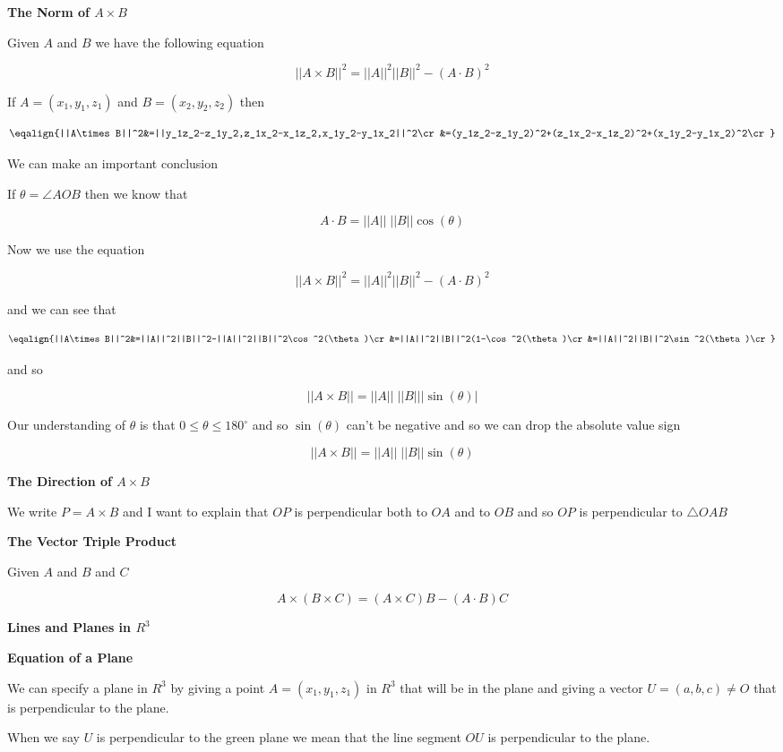 \filbreak
\vskip 1cm
{\bf The Norm of $A\times B$}

\vskip 1mm
Given $A$ and $B$ we have the following equation

$$||A\times B||^2=||A||^2||B||^2-(A\cdot B)^2$$

\vskip 1mm
If $A=(x_1,y_1,z_1)$ and $B=(x_2,y_2,z_2)$ then

$$\eqalign{||A\times B||^2&=||y_1z_2-z_1y_2,z_1x_2-x_1z_2,x_1y_2-y_1x_2||^2\cr
		&=(y_1z_2-z_1y_2)^2+(z_1x_2-x_1z_2)^2+(x_1y_2-y_1x_2)^2\cr}$$

\vskip 1mm
We can make an important conclusion

\vskip 1mm
If $\theta=\angle AOB$ then we know that

$$A\cdot B=||A||\;||B||\cos(\theta)$$

Now we use the equation

$$||A\times B||^2=||A||^2||B||^2-(A\cdot B)^2$$

and we can see that

$$\eqalign{||A\times B||^2&=||A||^2||B||^2-||A||^2||B||^2\cos^2(\theta)\cr
		&=||A||^2||B||^2(1-\cos^2(\theta)\cr
		&=||A||^2||B||^2\sin^2(\theta)\cr}$$

and so

$$||A\times B||=||A||\;||B|||\sin(\theta)|$$

Our understanding of $\theta$ is that $0\leq\theta\leq180^\circ$ and so $\sin(\theta)$ can't be negative and so we can drop the absolute value sign

$$||A\times B||=||A||\;||B||\sin(\theta)$$

\filbreak
\vskip 1cm
{\bf The Direction of $A\times B$}

\vskip 1mm
We write $P=A\times B$ and I want to explain that $OP$ is perpendicular both to $OA$ and to $OB$ and so $OP$ is perpendicular to $\triangle OAB$

\filbreak
\vskip 1cm
{\bf The Vector Triple Product}

\vskip 1mm
Given $A$ and $B$ and $C$

$$A\times(B\times C)=(A\times C)B-(A\cdot B)C$$

\filbreak
\vskip 1cm
{\bf Lines and Planes in $R^3$}

\vskip 1mm
{\bf Equation of a Plane}

\vskip 1mm
We can specify a plane in $R^3$ by giving a point $A=(x_1,y_1,z_1)$ in $R^3$ that will be in the plane and giving a vector $U=(a,b,c)\neq O$ that is perpendicular to the plane.

\vskip 1mm
When we say $U$ is perpendicular to the green plane we mean that the line segment $OU$ is perpendicular to the plane.

